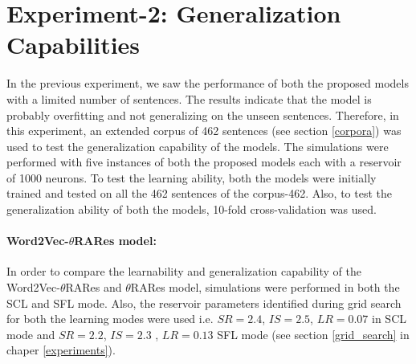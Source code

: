\section{Experiment-2: Generalization Capabilities} \label{exp-2}

In the previous experiment, we saw the performance of both the proposed models with a limited number of sentences. The results indicate that the model is probably overfitting and not generalizing on the unseen sentences. Therefore, in this experiment, an extended corpus of 462 sentences (see section \ref{corpora}) was used to test the generalization capability of the models. The simulations were performed with five instances of both the proposed models each with a reservoir of 1000 neurons. To test the learning ability, both the models were initially trained and tested on all the 462 sentences of the corpus-462. Also, to test the generalization ability of both the models, 10-fold cross-validation was used.  

\paragraph{Word2Vec-$\theta$RARes model:} 

In order to compare the learnability and generalization capability of the Word2Vec-$\theta$RARes and $\theta$RARes model, simulations were performed in both the SCL and SFL mode. Also, the reservoir parameters identified during grid search for both the learning modes were used i.e. $SR = 2.4$, $IS = 2.5$, $LR = 0.07$ in SCL mode and $SR = 2.2$, $IS = 2.3$ , $LR = 0.13$ SFL mode (see section \ref{grid_search} in chaper \ref{experiments}). 


